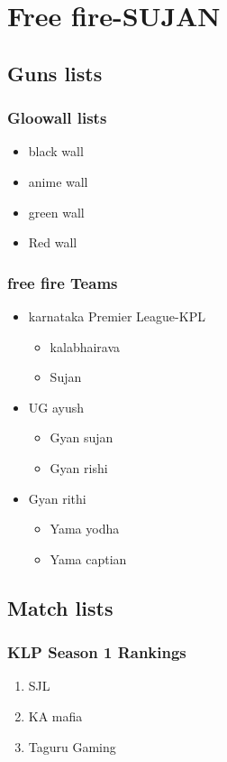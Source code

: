 \documentclass[6pt,a4paper]{report}
\begin{document}
\chapter{Free fire-SUJAN} 
\begin{small} 
\section*{Guns lists} 
\subsection*{Gloowall lists} 
\begin{itemize} 
\item black wall 
\item anime wall
\item green wall 
\item Red wall 
\end{itemize} 
\subsection*{free fire  Teams} 
\begin{itemize} 
\item karnataka Premier League-KPL
\begin{itemize} 
\item kalabhairava 
\item Sujan 
\end{itemize} 
\item UG ayush 
\begin{itemize} 
\item Gyan sujan 
\item Gyan rishi 
\end{itemize} 
\item Gyan rithi 
\begin{itemize} 
\item Yama yodha 
\item Yama captian
\end{itemize} 
\end{itemize} 
\section*{Match lists} 
\subsection*{KLP Season 1 Rankings} 
\begin{enumerate} 
\item SJL 
\item KA mafia
\item Taguru Gaming
\end{enumerate} 

\end{small}
\end{document}
